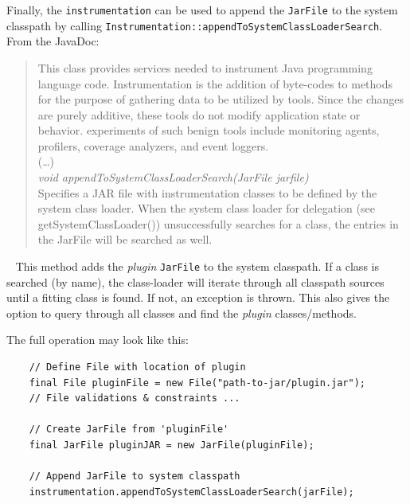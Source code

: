 Finally, the \lstinline{instrumentation} can be used to append the \lstinline{JarFile} to the system classpath by calling \lstinline{Instrumentation::appendToSystemClassLoaderSearch}.\\
From the JavaDoc:
\begin{quote}
    This class provides services needed to instrument Java programming language code. Instrumentation is the addition of byte-codes to methods for the purpose of gathering data to be utilized by tools. Since the changes are purely additive, these tools do not modify application state or behavior. experiments of such benign tools include monitoring agents, profilers, coverage analyzers, and event loggers.
    \\
    (\dots)
    \\
    \textit{void appendToSystemClassLoaderSearch(JarFile jarfile)}\\
    Specifies a JAR file with instrumentation classes to be defined by the system class loader. When the system class loader for delegation (see getSystemClassLoader()) unsuccessfully searches for a class, the entries in the JarFile will be searched as well.
\end{quote}~\textcite{javadoc:instrumentation}
This method adds the \textit{plugin} \lstinline{JarFile} to the system classpath.
If a class is searched (by name), the class-loader will iterate through all classpath sources until a fitting class is found.
If not, an exception is thrown.
This also gives the option to query through all classes and find the \textit{plugin} classes/methods.

The full operation may look like this:
\begin{lstlisting}
    // Define File with location of plugin
    final File pluginFile = new File("path-to-jar/plugin.jar");
    // File validations & constraints ...

    // Create JarFile from 'pluginFile'
    final JarFile pluginJAR = new JarFile(pluginFile);

    // Append JarFile to system classpath
    instrumentation.appendToSystemClassLoaderSearch(jarFile);
\end{lstlisting}